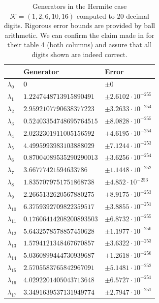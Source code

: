 \documentclass[a4paper,10pt]{article}
\begin{document}
\begin{appendix}
\begin{table}
  \centering
  \begin{tabular}{|l|ll|}
  \hline
  {}             & Generator                & Error \\
  \hline
  $\lambda_{0}$  & $0$                      & $\pm 0$ \\
  $\lambda_{1}$  & $1.2247448713915890491$  & $\pm 2.6102 \cdot 10^{-255}$ \\
  $\lambda_{2}$  & $2.9592107790638377223$  & $\pm 3.2633 \cdot 10^{-254}$ \\
  $\lambda_{3}$  & $0.52403354748695764515$ & $\pm 8.0828 \cdot 10^{-255}$ \\
  $\lambda_{4}$  & $2.0232301911005156592$  & $\pm 4.6195 \cdot 10^{-254}$ \\
  $\lambda_{5}$  & $4.4995993983103888029$  & $\pm 7.1244 \cdot 10^{-253}$ \\
  $\lambda_{6}$  & $0.87004089535290290013$ & $\pm 3.6256 \cdot 10^{-254}$ \\
  $\lambda_{7}$  & $3.66777421594633786$    & $\pm 1.1448 \cdot 10^{-252}$ \\
  $\lambda_{8}$  & $1.8357079751751868738$  & $\pm 4.852 \cdot 10^{-253}$ \\
  $\lambda_{9}$  & $2.2665132620567880275$  & $\pm 8.9175 \cdot 10^{-253}$ \\
  $\lambda_{10}$ & $6.3759392709822359517$  & $\pm 3.8855 \cdot 10^{-251}$ \\
  $\lambda_{11}$ & $0.17606414208200893503$ & $\pm 6.8732 \cdot 10^{-255}$ \\
  $\lambda_{12}$ & $5.6432578578857450628$  & $\pm 1.1977 \cdot 10^{-250}$ \\
  $\lambda_{13}$ & $1.5794121348467670857$  & $\pm 3.6322 \cdot 10^{-253}$ \\
  $\lambda_{14}$ & $5.0360899444730939687$  & $\pm 1.2618 \cdot 10^{-250}$ \\
  $\lambda_{15}$ & $2.5705583765842967091$  & $\pm 5.1481 \cdot 10^{-252}$ \\
  $\lambda_{16}$ & $4.0292201405043713648$  & $\pm 6.5727 \cdot 10^{-251}$ \\
  $\lambda_{17}$ & $3.3491639537131949774$  & $\pm 2.7947 \cdot 10^{-251}$ \\
  \hline
  \end{tabular}
  \caption{Generators in the Hermite case $\mathcal{K} = (1, 2, 6, 10, 16)$
  computed to 20 decimal digits. Rigorous error bounds are provided by ball
  arithmetic. We can confirm the claim made in \cite{genz_keister} for their
  table 4 (both columns) and assure that all digits shown are indeed correct.}
\end{table}


\end{appendix}
\end{document}
